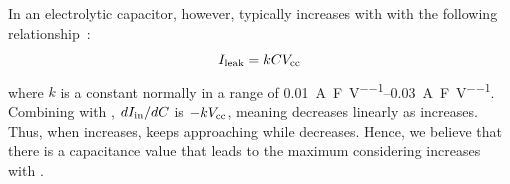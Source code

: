 In an electrolytic capacitor, however,  typically increases with  with the following relationship~\cite{avxleakage}:
\begin{equation}
    I_{\text{leak}} = kCV_{\text{cc}}
    \label{eq:ileak}
\end{equation}
where $k$ is a constant normally in a range of \SIrange{0.01}{0.03}{\ampere\per\farad\per\volt}. Combining  with , $dI_{\text{in}} / dC$ is $-kV_{\text{cc}}$, meaning  decreases linearly as  increases. Thus, when  increases,  keeps approaching  while  decreases. Hence, we believe that there is a capacitance value that leads to the maximum  considering  increases with .


